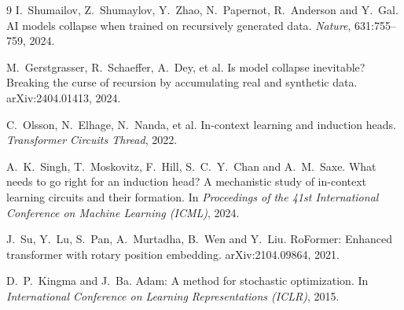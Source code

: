 \documentclass[11pt,a4paper]{article}
\begin{document}
\begin{thebibliography}{9}
I.~Shumailov, Z.~Shumaylov, Y.~Zhao, N.~Papernot, R.~Anderson and Y.~Gal.
\newblock AI models collapse when trained on recursively generated data.
\newblock \emph{Nature}, 631:755--759, 2024.

M.~Gerstgrasser, R.~Schaeffer, A.~Dey, et al.
\newblock Is model collapse inevitable? Breaking the curse of recursion by
accumulating real and synthetic data.
\newblock arXiv:2404.01413, 2024.

C.~Olsson, N.~Elhage, N.~Nanda, et al.
\newblock In-context learning and induction heads.
\newblock \emph{Transformer Circuits Thread}, 2022.

A.~K.~Singh, T.~Moskovitz, F.~Hill, S.~C.~Y.~Chan and A.~M.~Saxe.
\newblock What needs to go right for an induction head? A mechanistic study of
in-context learning circuits and their formation.
\newblock In \emph{Proceedings of the 41st International Conference on Machine
Learning (ICML)}, 2024.

J.~Su, Y.~Lu, S.~Pan, A.~Murtadha, B.~Wen and Y.~Liu.
\newblock RoFormer: Enhanced transformer with rotary position embedding.
\newblock arXiv:2104.09864, 2021.

D.~P.~Kingma and J.~Ba.
\newblock Adam: A method for stochastic optimization.
\newblock In \emph{International Conference on Learning Representations
(ICLR)}, 2015.
\end{thebibliography}
\end{document}
